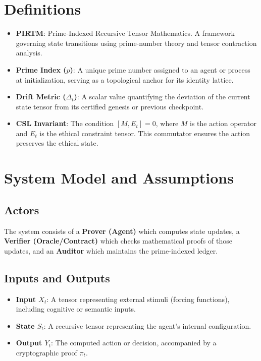 \documentclass[11pt, a4paper]{article}
\begin{document}
\section{Definitions}
\begin{itemize}[leftmargin=*]
    \item \textbf{PIRTM}: Prime-Indexed Recursive Tensor Mathematics. A framework governing state transitions using prime-number theory and tensor contraction analysis.
    \item \textbf{Prime Index ($p$)}: A unique prime number assigned to an agent or process at initialization, serving as a topological anchor for its identity lattice.
    \item \textbf{Drift Metric ($\Delta_t$)}: A scalar value quantifying the deviation of the current state tensor from its certified genesis or previous checkpoint.
    \item \textbf{CSL Invariant}: The condition $[M, E_t] = 0$, where $M$ is the action operator and $E_t$ is the ethical constraint tensor. This commutator ensures the action preserves the ethical state.
\end{itemize}

\section{System Model and Assumptions}
\subsection{Actors}
The system consists of a \textbf{Prover (Agent)} which computes state updates, a \textbf{Verifier (Oracle/Contract)} which checks mathematical proofs of those updates, and an \textbf{Auditor} which maintains the prime-indexed ledger.

\subsection{Inputs and Outputs}
\begin{itemize}
    \item \textbf{Input $X_t$}: A tensor representing external stimuli (forcing functions), including cognitive or semantic inputs.
    \item \textbf{State $S_t$}: A recursive tensor representing the agent's internal configuration.
    \item \textbf{Output $Y_t$}: The computed action or decision, accompanied by a cryptographic proof $\pi_t$.
\end{itemize}
\end{document}
